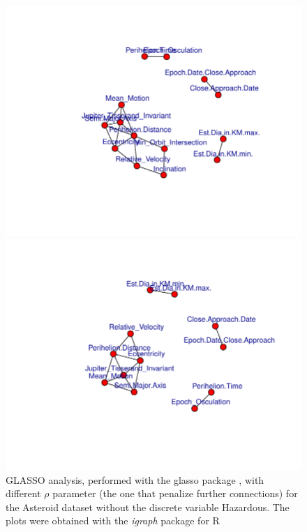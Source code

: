 \documentclass[12pt,%
               a4paper,%
               oneside,openany,%
               titlepage,%
               headinclude,footinclude,%
               BCOR5mm,%
               cleardoublepage=empty,%
               tablecaptionabove,%
               floatperchapter,
               ]{scrreprt}                 %
\begin{document}
\begin{figure}[ht]
\begin{minipage}[b]{0.5\linewidth}
    \includegraphics[width=.9\linewidth]{Figures/GLASSO_0.3.pdf}
    \vspace{4ex}
  \end{minipage}%
    \begin{minipage}[b]{0.5\linewidth}
    \centering
    \includegraphics[width=.9\linewidth]{Figures/GLASSO_0.4.pdf}
    \vspace{4ex}
  \end{minipage}%
\caption{GLASSO analysis, performed with the glasso package \cite{friedman2008sparse,glasso}, with different $\rho$ parameter (the one that penalize further connections) for the Asteroid dataset without the discrete variable Hazardous. The plots were obtained with the \textit{igraph} package for R \cite{igraph}}
\label{GLASSO_convergence}
\end{figure}
\end{document}
